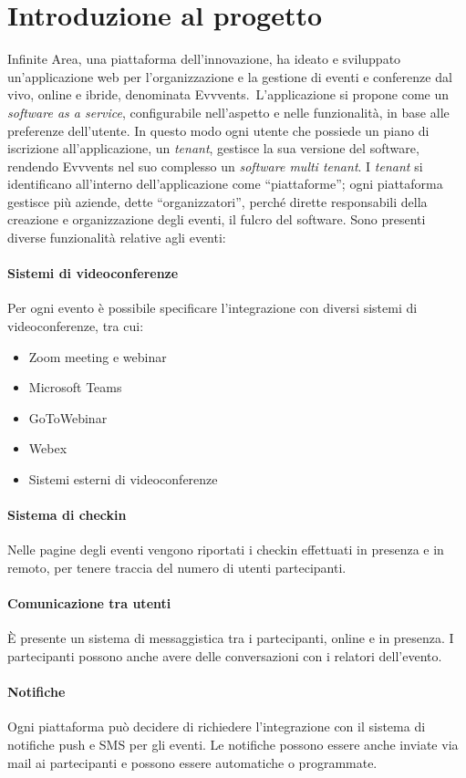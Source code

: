\section{Introduzione al progetto}
Infinite Area, una piattaforma dell'innovazione, ha ideato e sviluppato un'applicazione web per l'organizzazione e la gestione di eventi e conferenze dal vivo, online e ibride, denominata Evvvents.\ L'applicazione si propone come un \emph{software as a service}, configurabile nell'aspetto e nelle funzionalità, in base alle preferenze dell'utente. In questo modo ogni utente che possiede un piano di iscrizione all'applicazione, un \emph{tenant}, gestisce la sua versione del software, rendendo Evvvents nel suo complesso un \emph{software multi tenant}. I \emph{tenant} si identificano all'interno dell'applicazione come ``piattaforme''; ogni piattaforma gestisce più aziende, dette ``organizzatori'', perché dirette responsabili della creazione e organizzazione degli eventi, il fulcro del software. Sono presenti diverse funzionalità relative agli eventi:
\paragraph{Sistemi di videoconferenze} Per ogni evento è possibile specificare l'integrazione con diversi sistemi di videoconferenze, tra cui:
\begin{itemize}
	\item Zoom meeting e webinar
	\item Microsoft Teams
	\item GoToWebinar
	\item Webex
	\item Sistemi esterni di videoconferenze
\end{itemize}
\paragraph{Sistema di checkin} Nelle pagine degli eventi vengono riportati i checkin effettuati in presenza e in remoto, per tenere traccia del numero di utenti partecipanti.
\paragraph{Comunicazione tra utenti} È presente un sistema di messaggistica tra i partecipanti, online e in presenza. I partecipanti possono anche avere delle conversazioni con i relatori dell'evento.
\paragraph{Notifiche} Ogni piattaforma può decidere di richiedere l'integrazione con il sistema di notifiche push e SMS per gli eventi. Le notifiche possono essere anche inviate via mail ai partecipanti e possono essere automatiche o programmate.

